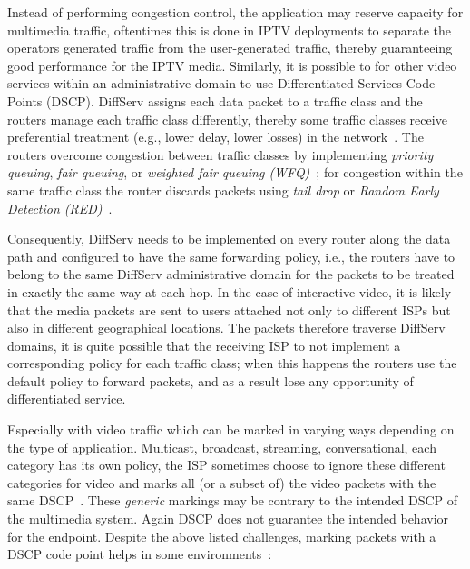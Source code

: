 Instead of performing congestion control, the application may reserve capacity
for multimedia traffic, oftentimes this is done in IPTV deployments to
separate the operators generated traffic from the user-generated traffic,
thereby guaranteeing good performance for the IPTV media. Similarly, it is
possible to for other video services within an administrative domain to use
Differentiated Services Code Points (DSCP). DiffServ assigns each data packet
to a traffic class and the routers manage each traffic class differently,
thereby some traffic classes receive preferential treatment (e.g., lower
delay, lower losses) in the network~\cite{rfc2475}. The routers overcome
congestion between traffic classes by implementing \emph{priority queuing},
\emph{fair queuing}, or \emph{weighted fair queuing (WFQ)}~\cite{rfc4594}; for
congestion within the same traffic class the router discards packets using
\emph{tail drop} or \emph{Random Early Detection (RED)}~\cite{Floyd:RED}.


Consequently, DiffServ needs to be implemented on every router along the data
path and configured to have the same forwarding policy, i.e., the routers have
to belong to the same DiffServ administrative domain for the packets to be
treated in exactly the same way at each hop. In the case of interactive video,
it is likely that the media packets are sent to users attached not only to
different ISPs but also in different geographical locations. The packets
therefore traverse DiffServ domains, it is quite possible that the receiving
ISP to not implement a corresponding policy for each  traffic class; when this
happens the routers use the default policy to forward packets, and as a result
lose any opportunity of differentiated service.


Especially with video traffic which can be marked in varying ways depending on
the type of application. Multicast, broadcast, streaming, conversational, each
category has its own policy, the ISP sometimes choose to ignore these
different categories for video and marks all (or a subset of) the video
packets with the same DSCP~\cite{rfc5865}. These \emph{generic} markings may
be contrary to the intended DSCP of the multimedia system. Again DSCP does not
guarantee the intended behavior for the endpoint. Despite the above listed
challenges, marking packets with a DSCP code point helps in some
environments~\cite{draft.rtcweb.qos}:


